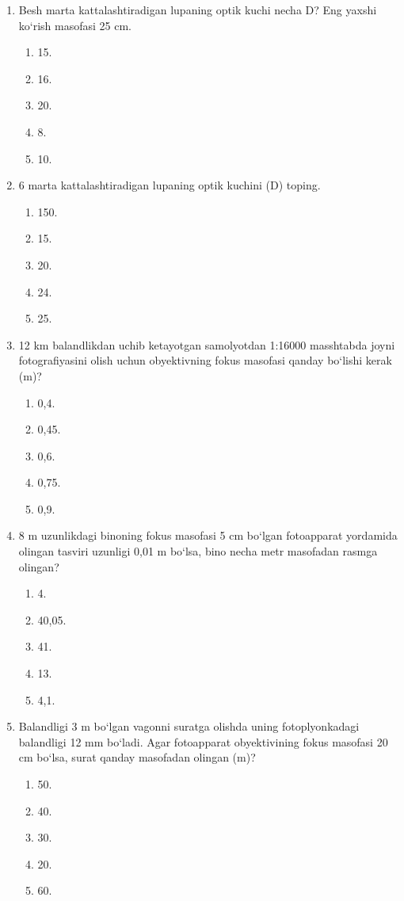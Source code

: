 \begin{enumerate}
\item Besh marta kattalashtiradigan lupaning optik kuchi necha D? Eng yaxshi ko‘rish masofasi 25 cm.
\begin{enumerate}[label=\Alph*)]
\item 15.
\item 16.
\item 20.
\item 8.
\item 10.
\end{enumerate}

\item 6 marta kattalashtiradigan lupaning optik kuchini (D) toping.
\begin{enumerate}[label=\Alph*)]
\item 150.
\item 15.
\item 20.
\item 24.
\item 25.
\end{enumerate}

\item 12 km balandlikdan uchib ketayotgan samolyotdan 1:16000 masshtabda joyni fotografiyasini olish uchun obyektivning fokus masofasi qanday bo‘lishi kerak (m)?
\begin{enumerate}[label=\Alph*)]
\item 0,4.
\item 0,45.
\item 0,6.
\item 0,75.
\item 0,9.
\end{enumerate}

\item 8 m uzunlikdagi binoning fokus masofasi 5 cm bo‘lgan fotoapparat yordamida olingan tasviri uzunligi 0,01 m bo‘lsa, bino necha metr masofadan rasmga olingan?
\begin{enumerate}[label=\Alph*)]
\item 4.
\item 40,05.
\item 41.
\item 13.
\item 4,1.
\end{enumerate}

\item Balandligi 3 m bo‘lgan vagonni suratga olishda uning fotoplyonkadagi balandligi 12 mm bo‘ladi. Agar fotoapparat obyektivining fokus masofasi 20 cm bo‘lsa, surat qanday masofadan olingan (m)?
\begin{enumerate}[label=\Alph*)]
\item 50.
\item 40.
\item 30.
\item 20.
\item 60.
\end{enumerate}


\end{enumerate}
